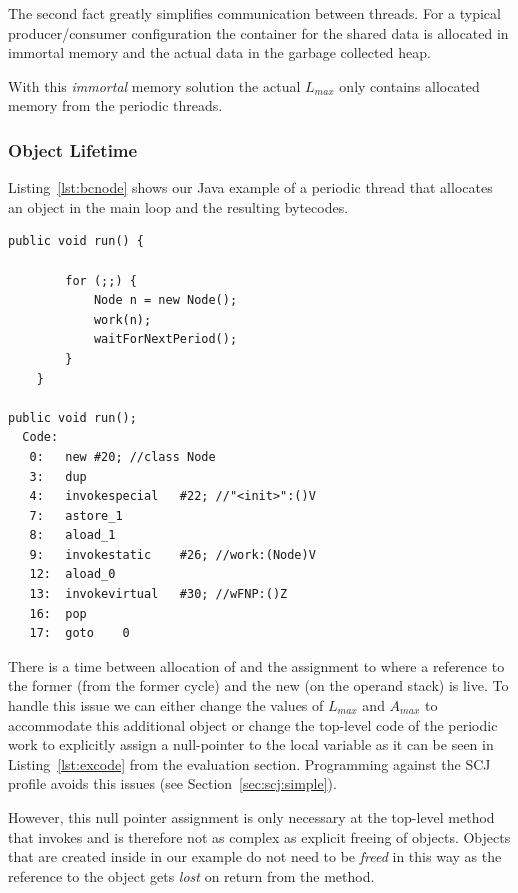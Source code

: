 The second fact greatly simplifies communication between threads.
For a typical producer/consumer configuration the container for the
shared data is allocated in immortal memory and the actual data in
the garbage collected heap.

With this \emph{immortal} memory solution the actual $L_{max}$ only
contains allocated memory from the periodic threads.

\subsubsection{Object Lifetime} \label{sec:wc:live}

Listing~\ref{lst:bcnode} shows our Java example of a periodic thread
that allocates an object in the main loop and the resulting
bytecodes.

\begin{lstlisting}[float, caption={Example periodic thread and the corresponding Java bytecodes},
label=lst:bcnode]
    public void run() {

        for (;;) {
            Node n = new Node();
            work(n);
            waitForNextPeriod();
        }
    }

public void run();
  Code:
   0:   new #20; //class Node
   3:   dup
   4:   invokespecial   #22; //"<init>":()V
   7:   astore_1
   8:   aload_1
   9:   invokestatic    #26; //work:(Node)V
   12:  aload_0
   13:  invokevirtual   #30; //wFNP:()Z
   16:  pop
   17:  goto    0
\end{lstlisting}

There is a time between allocation of  and the assignment
to  where a reference to the former  (from the
former cycle) and the new  (on the operand stack) is live.
To handle this issue we can either change the values of $L_{max}$ and
$A_{max}$ to accommodate this additional object or change the
top-level code of the periodic work to explicitly assign a
null-pointer to the local variable  as it can be seen in
Listing~\ref{lst:excode} from the evaluation section. Programming
against the SCJ profile avoids this issues (see
Section~\ref{sec:scj:simple}).

However, this null pointer assignment is only necessary at the
top-level method that invokes  and is
therefore not as complex as explicit freeing of objects. Objects
that are created inside  in our example do not need to be
\emph{freed} in this way as the reference to the object gets
\emph{lost} on return from the method.

